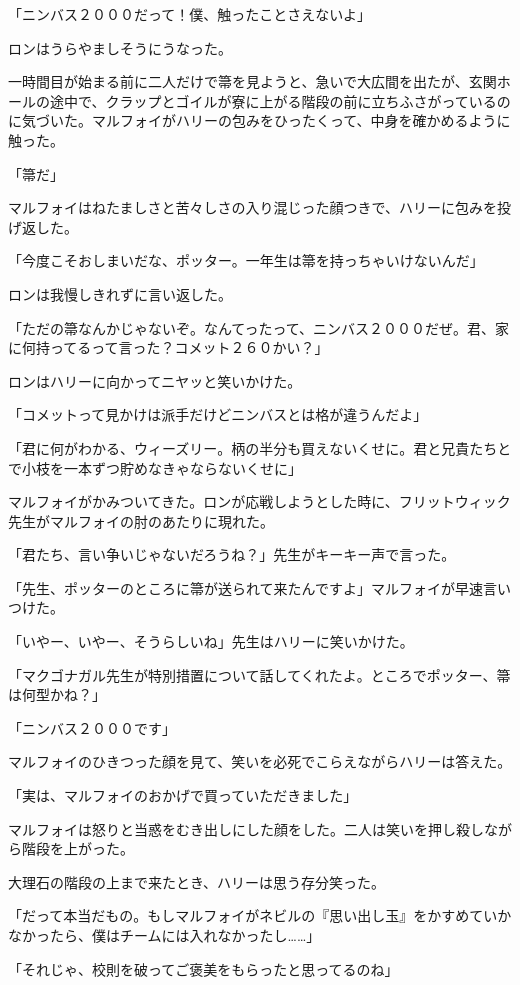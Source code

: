 \documentclass[10pt,a4paper]{article}
\begin{document}
\begin{CJK}{UTF8}{min}
「ニンバス２０００だって！僕、触ったことさえないよ」

ロンはうらやましそうにうなった。

一時間目が始まる前に二人だけで箒を見ようと、急いで大広間を出たが、玄関ホールの途中で、クラップとゴイルが寮に上がる階段の前に立ちふさがっているのに気づいた。マルフォイがハリーの包みをひったくって、中身を確かめるように触った。

「箒だ」

マルフォイはねたましさと苦々しさの入り混じった顔つきで、ハリーに包みを投げ返した。

「今度こそおしまいだな、ポッター。一年生は箒を持っちゃいけないんだ」

ロンは我慢しきれずに言い返した。

「ただの箒なんかじゃないぞ。なんてったって、ニンバス２０００だぜ。君、家に何持ってるって言った？コメット２６０かい？」

ロンはハリーに向かってニヤッと笑いかけた。

「コメットって見かけは派手だけどニンバスとは格が違うんだよ」

「君に何がわかる、ウィーズリー。柄の半分も買えないくせに。君と兄貴たちとで小枝を一本ずつ貯めなきゃならないくせに」

マルフォイがかみついてきた。ロンが応戦しようとした時に、フリットウィック先生がマルフォイの肘のあたりに現れた。

「君たち、言い争いじゃないだろうね？」先生がキーキー声で言った。

「先生、ポッターのところに箒が送られて来たんですよ」マルフォイが早速言いつけた。

「いやー、いやー、そうらしいね」先生はハリーに笑いかけた。

「マクゴナガル先生が特別措置について話してくれたよ。ところでポッター、箒は何型かね？」

「ニンバス２０００です」

マルフォイのひきつった顔を見て、笑いを必死でこらえながらハリーは答えた。

「実は、マルフォイのおかげで買っていただきました」

マルフォイは怒りと当惑をむき出しにした顔をした。二人は笑いを押し殺しながら階段を上がった。

大理石の階段の上まで来たとき、ハリーは思う存分笑った。

「だって本当だもの。もしマルフォイがネビルの『思い出し玉』をかすめていかなかったら、僕はチームには入れなかったし……」

「それじゃ、校則を破ってご褒美をもらったと思ってるのね」


\end{CJK}
\end{document}
